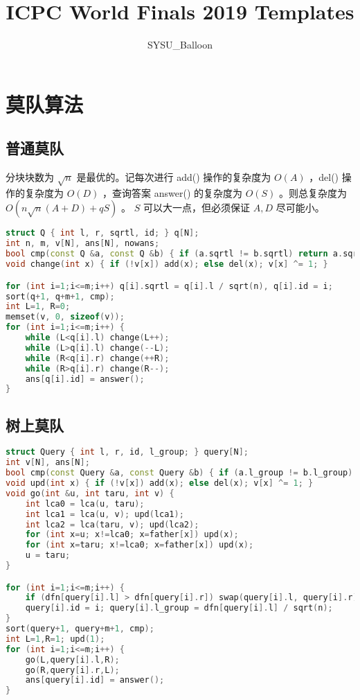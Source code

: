 \documentclass{article}
\begin{document}
\title{ICPC World Finals 2019 Templates}
\author {SYSU\_Balloon}
\maketitle
\tableofcontents
\newpage
\section{莫队算法}
\subsection{普通莫队}

分块块数为 $\sqrt{n}$ 是最优的。记每次进行 add() 操作的复杂度为 $O(A)$ ，del() 操作的复杂度为 $O(D)$ ，查询答案 answer() 的复杂度为 $O(S)$ 。则总复杂度为 $O(n \sqrt{n} (A + D) + qS)$ 。 $S$ 可以大一点，但必须保证 $A, D$ 尽可能小。

\begin{lstlisting}[language=C++]
struct Q { int l, r, sqrtl, id; } q[N];
int n, m, v[N], ans[N], nowans;
bool cmp(const Q &a, const Q &b) { if (a.sqrtl != b.sqrtl) return a.sqrtl < b.sqrtl; return a.r < b.r; }
void change(int x) { if (!v[x]) add(x); else del(x); v[x] ^= 1; }

for (int i=1;i<=m;i++) q[i].sqrtl = q[i].l / sqrt(n), q[i].id = i;
sort(q+1, q+m+1, cmp);
int L=1, R=0;
memset(v, 0, sizeof(v));
for (int i=1;i<=m;i++) {
	while (L<q[i].l) change(L++);
	while (L>q[i].l) change(--L);
	while (R<q[i].r) change(++R);
	while (R>q[i].r) change(R--);
	ans[q[i].id] = answer();
}
\end{lstlisting}
\subsection{树上莫队}

\begin{lstlisting}[language=C++]
struct Query { int l, r, id, l_group; } query[N];
int v[N], ans[N];
bool cmp(const Query &a, const Query &b) { if (a.l_group != b.l_group) return a.l_group < b.l_group; return dfn[a.r] < dfn[b.r]; }
void upd(int x) { if (!v[x]) add(x); else del(x); v[x] ^= 1; }
void go(int &u, int taru, int v) {
	int lca0 = lca(u, taru);
	int lca1 = lca(u, v); upd(lca1);
	int lca2 = lca(taru, v); upd(lca2);
	for (int x=u; x!=lca0; x=father[x]) upd(x);
	for (int x=taru; x!=lca0; x=father[x]) upd(x);
	u = taru;
}

for (int i=1;i<=m;i++) {
	if (dfn[query[i].l] > dfn[query[i].r]) swap(query[i].l, query[i].r);
	query[i].id = i; query[i].l_group = dfn[query[i].l] / sqrt(n);
}
sort(query+1, query+m+1, cmp);
int L=1,R=1; upd(1);
for (int i=1;i<=m;i++) {
	go(L,query[i].l,R);
	go(R,query[i].r,L);
	ans[query[i].id] = answer();
}
\end{lstlisting}
\end{document}
